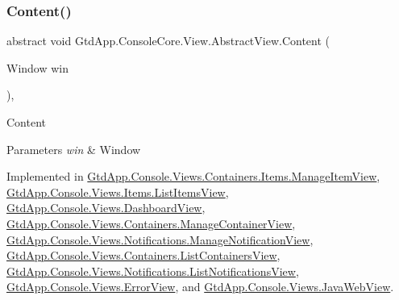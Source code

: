 \subsubsection{\texorpdfstring{Content()}{Content()}}
{\footnotesize\ttfamily abstract void Gtd\+App.\+Console\+Core.\+View.\+Abstract\+View.\+Content (\begin{DoxyParamCaption}\item[{Window}]{win }\end{DoxyParamCaption})\hspace{0.3cm}{\ttfamily [protected]}, {}}



Content 


\begin{DoxyParams}{Parameters}
{\em win} & Window\\
\hline
\end{DoxyParams}


Implemented in \mbox{\hyperlink{class_gtd_app_1_1_console_1_1_views_1_1_containers_1_1_items_1_1_manage_item_view_a4b066141a958d2dc737722d5c6e2b3c6}{Gtd\+App.\+Console.\+Views.\+Containers.\+Items.\+Manage\+Item\+View}}, \mbox{\hyperlink{class_gtd_app_1_1_console_1_1_views_1_1_items_1_1_list_items_view_a1033569c645e453ef7b1faf29897684f}{Gtd\+App.\+Console.\+Views.\+Items.\+List\+Items\+View}}, \mbox{\hyperlink{class_gtd_app_1_1_console_1_1_views_1_1_dashboard_view_a29942731cb49497c4f86fc47e3aa3a7e}{Gtd\+App.\+Console.\+Views.\+Dashboard\+View}}, \mbox{\hyperlink{class_gtd_app_1_1_console_1_1_views_1_1_containers_1_1_manage_container_view_affada33c424f2587976a73bceca5af2e}{Gtd\+App.\+Console.\+Views.\+Containers.\+Manage\+Container\+View}}, \mbox{\hyperlink{class_gtd_app_1_1_console_1_1_views_1_1_notifications_1_1_manage_notification_view_a756cd48ab1bef286f2f983432416cba6}{Gtd\+App.\+Console.\+Views.\+Notifications.\+Manage\+Notification\+View}}, \mbox{\hyperlink{class_gtd_app_1_1_console_1_1_views_1_1_containers_1_1_list_containers_view_a27f8e950a87748409e4911046309a299}{Gtd\+App.\+Console.\+Views.\+Containers.\+List\+Containers\+View}}, \mbox{\hyperlink{class_gtd_app_1_1_console_1_1_views_1_1_notifications_1_1_list_notifications_view_a81f1e9ff319de52b7cb8d945673540ee}{Gtd\+App.\+Console.\+Views.\+Notifications.\+List\+Notifications\+View}}, \mbox{\hyperlink{class_gtd_app_1_1_console_1_1_views_1_1_error_view_a0d228bc1e760ed818a207e7399011839}{Gtd\+App.\+Console.\+Views.\+Error\+View}}, and \mbox{\hyperlink{class_gtd_app_1_1_console_1_1_views_1_1_java_web_view_a1e6174598b11cfe2eac028138c9549a4}{Gtd\+App.\+Console.\+Views.\+Java\+Web\+View}}.

